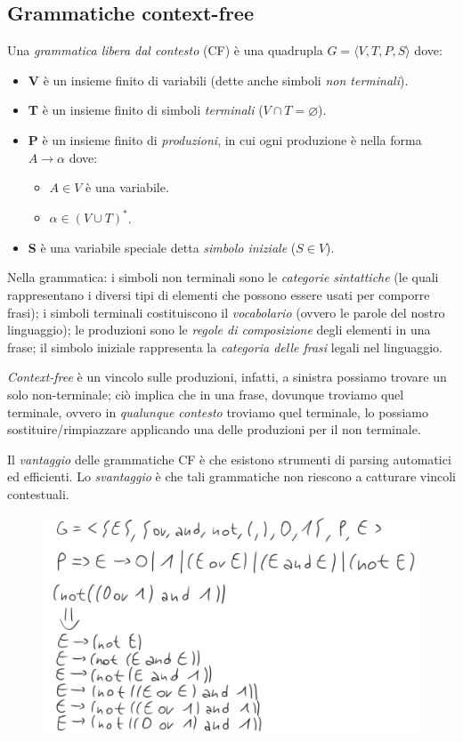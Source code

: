 \documentclass[a4paper,oneside,titlepage]{book}
\begin{document}
\subsection{Grammatiche context-free}
Una \textit{grammatica libera dal contesto} (CF) è una quadrupla $G = \langle V,T,P,S \rangle$ dove:
\begin{itemize}
	\item \textbf{V} è un insieme finito di variabili (dette anche simboli \textit{non terminali}).
	\item \textbf{T} è un insieme finito di simboli \textit{terminali} ($ V \cap T = \varnothing $).
	\item \textbf{P} è un insieme finito di \textit{produzioni}, in cui ogni produzione è nella forma $A \rightarrow \alpha $ dove:
	\begin{itemize}
		\item $A \in V$ è una variabile.
		\item $\alpha \in (V \cup T)^*$.
	\end{itemize}
	\item \textbf{S} è una variabile speciale detta \textit{simbolo iniziale} ($S \in V$).
\end{itemize}
Nella grammatica: i simboli non terminali sono le \textit{categorie sintattiche} (le quali rappresentano i diversi tipi di elementi che possono essere usati per comporre frasi); i simboli terminali costituiscono il \textit{vocabolario} (ovvero le parole del nostro linguaggio); le produzioni sono le \textit{regole di composizione} degli elementi in una frase; il simbolo iniziale rappresenta la \textit{categoria delle frasi} legali nel linguaggio.

\textit{Context-free} è un vincolo sulle produzioni, infatti, a sinistra possiamo trovare un solo non-terminale; ciò implica che in una frase, dovunque troviamo quel terminale, ovvero in \textit{qualunque contesto} troviamo quel terminale, lo possiamo sostituire/rimpiazzare applicando una delle produzioni per il non terminale.

Il \textit{vantaggio} delle grammatiche CF è che esistono strumenti di parsing automatici ed efficienti. Lo \textit{svantaggio} è che tali grammatiche non riescono a catturare vincoli contestuali.
\begin{figure}[htp]
	\centering
	\includegraphics[width=\textwidth, height=\textheight, keepaspectratio]{cfg.png}
\end{figure}
\newpage
\end{document}

